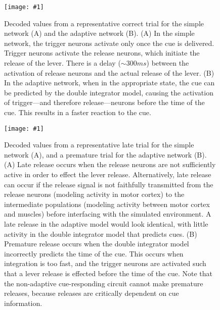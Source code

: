 \documentclass[11pt]{article}
\newcommand{\scalefigone}[3]{
  \begin{figure}[ht!]
    \centering
    \texttt{[image: \#1]}
    \caption{#3}
    \label{#1}
  \end{figure}}
\begin{document}
\scalefigone{fig11}{1.0}{
  Decoded values from a representative correct trial
  for the simple network (A) and the adaptive network (B).
  (A) In the simple network, the trigger neurons
  activate only once the cue is delivered.
  Trigger neurons activate the release neurons,
  which initiate the release of the lever.
  There is a delay ($\sim 300ms$)
  between the activation of release neurons
  and the actual release of the lever.
  (B) In the adaptive network, when
  in the appropriate state, the cue
  can be predicted by the double integrator model,
  causing the activation of trigger---and
  therefore release---neurons before
  the time of the cue. This results
  in a faster reaction to the cue.
}

\scalefigone{fig12}{1.0}{
  Decoded values from a representative late trial for the simple
  network (A), and a premature trial for
  the adaptive network (B).
  (A) Late release occurs when
  the release neurons are not sufficiently
  active in order to effect the lever release.
  Alternatively, late release can occur
  if the release signal is not faithfully
  transmitted from the release neurons
  (modeling activity in motor cortex)
  to the intermediate populations
  (modeling activity between motor cortex and muscles)
  before interfacing with the simulated environment.
  A late release in the adaptive model
  would look identical, with little activity
  in the double integrator model that predicts cues.
  (B) Premature release occurs when
  the double integrator model incorrectly predicts
  the time of the cue.
  This occurs when integration is too fast,
  and the trigger neurons are activated
  such that a lever release is effected
  before the time of the cue.
  Note that the non-adaptive cue-responding
  circuit cannot make premature releases,
  because releases are critically dependent
  on cue information.
}
\end{document}
